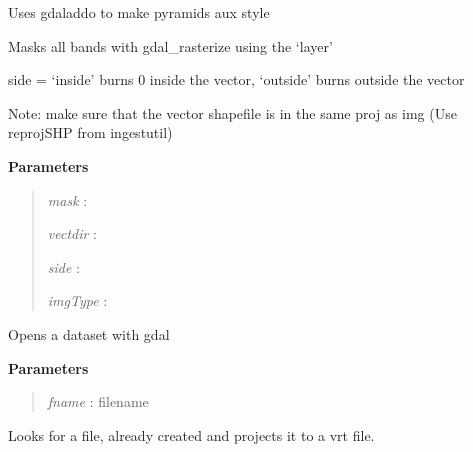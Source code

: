 \documentclass[letterpaper,10pt,english]{sphinxmanual}
\begin{document}
\begin{fulllineitems}
\begin{fulllineitems}
\begin{description}
\end{description}

\end{fulllineitems}


\begin{fulllineitems}
\label{code:Image.Image.makePyramids}
Uses gdaladdo to make pyramids aux style

\end{fulllineitems}


\begin{fulllineitems}
\label{code:Image.Image.maskImg}
Masks all bands with gdal\_rasterize using the `layer'

side = `inside' burns 0 inside the vector, `outside' burns outside the vector

Note: make sure that the vector shapefile is in the same proj as img (Use reprojSHP from ingestutil)

\textbf{Parameters}
\begin{quote}

\emph{mask}    :

\emph{vectdir} :

\emph{side}    :

\emph{imgType} :
\end{quote}

\end{fulllineitems}


\begin{fulllineitems}
\label{code:Image.Image.openDataset}
Opens a dataset with gdal

\textbf{Parameters}
\begin{quote}

\emph{fname} : filename
\end{quote}

\end{fulllineitems}


\begin{fulllineitems}
\label{code:Image.Image.projectImg}
Looks for a file, already created and projects it to a vrt file.


\end{fulllineitems}
\end{fulllineitems}
\end{document}

